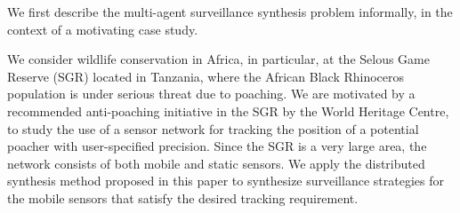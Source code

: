 We first describe the multi-agent surveillance synthesis problem informally, in the context of a motivating case study. 

We consider wildlife conservation in Africa, in particular, at the Selous Game Reserve (SGR) located in Tanzania, where the African Black Rhinoceros population is under serious threat due to poaching. We are motivated by a recommended anti-poaching initiative in the SGR by the World Heritage Centre,  to study the use of a sensor network for tracking the position of a potential poacher  with user-specified precision. Since the SGR is a very large area, the network consists of both mobile and static sensors. We apply the  distributed synthesis method proposed in this paper to synthesize surveillance strategies for the mobile sensors that satisfy the desired tracking requirement.


